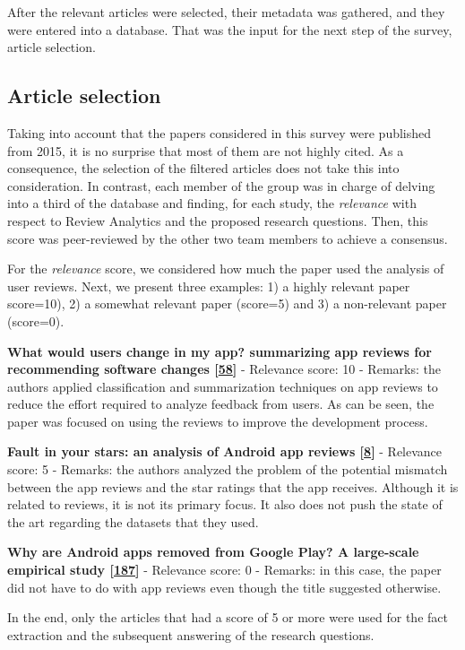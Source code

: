 \documentclass[]{book}
\begin{document}
After the relevant articles were selected, their metadata was gathered,
and they were entered into a database. That was the input for the next
step of the survey, article selection.

\subsection{Article selection}\label{article-selection}

Taking into account that the papers considered in this survey were
published from 2015, it is no surprise that most of them are not highly
cited. As a consequence, the selection of the filtered articles does not
take this into consideration. In contrast, each member of the group was
in charge of delving into a third of the database and finding, for each
study, the \emph{relevance} with respect to Review Analytics and the
proposed research questions. Then, this score was peer-reviewed by the
other two team members to achieve a consensus.

For the \emph{relevance} score, we considered how much the paper used
the analysis of user reviews. Next, we present three examples: 1) a
highly relevant paper score=10), 2) a somewhat relevant paper (score=5)
and 3) a non-relevant paper (score=0).

\textbf{What would users change in my app? summarizing app reviews for
recommending software changes
{[}\protect\hyperlink{ref-di2016would}{58}{]}} - Relevance score: 10 -
Remarks: the authors applied classification and summarization techniques
on app reviews to reduce the effort required to analyze feedback from
users. As can be seen, the paper was focused on using the reviews to
improve the development process.

\textbf{Fault in your stars: an analysis of Android app reviews
{[}\protect\hyperlink{ref-aralikatte2018fault}{8}{]}} - Relevance score:
5 - Remarks: the authors analyzed the problem of the potential mismatch
between the app reviews and the star ratings that the app receives.
Although it is related to reviews, it is not its primary focus. It also
does not push the state of the art regarding the datasets that they
used.

\textbf{Why are Android apps removed from Google Play? A large-scale
empirical study {[}\protect\hyperlink{ref-wang2018android}{187}{]}} -
Relevance score: 0 - Remarks: in this case, the paper did not have to do
with app reviews even though the title suggested otherwise.

In the end, only the articles that had a score of 5 or more were used
for the fact extraction and the subsequent answering of the research
questions.
\end{document}
